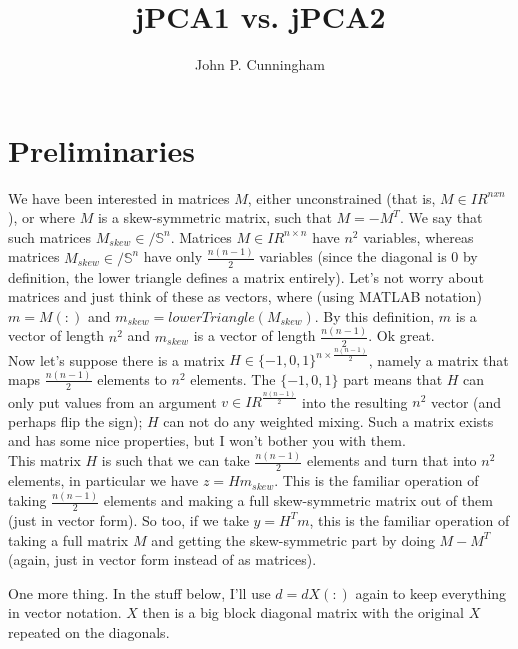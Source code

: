 \documentclass[11pt]{article}
\newcommand{\reals}{I\!\!R} %
\newcommand{\skewsym}{/\!\!\!\mathbb{S}}
\begin{document}
\title{jPCA1 vs. jPCA2}

\author{John P. Cunningham}


\maketitle


\section{Preliminaries}

We have been interested in matrices $M$, either unconstrained (that is, $M \in \reals^{n x n}$), or where $M$ is a skew-symmetric matrix, such that $M = -M^T$.  We say that such matrices $M_{skew} \in \skewsym^{n}$.  Matrices $M \in \reals^{n \times n}$ have $n^2$ variables, whereas matrices $M_{skew} \in \skewsym^{n}$ have only $\frac{n(n-1)}{2}$ variables (since the diagonal is 0 by definition, the lower triangle defines a matrix entirely).  Let's not worry about matrices and just think of these as vectors, where (using MATLAB notation) $m = M(:)$ and $m_{skew} = lowerTriangle(M_{skew})$.  By this definition, $m$ is a vector of length $n^2$ and $m_{skew}$ is a vector of length $\frac{n(n-1)}{2}$.  Ok great.
\\

Now let's suppose there is a matrix $H \in \{-1,0,1\}^{n \times \frac{n(n-1)}{2}}$, namely a matrix that maps $\frac{n(n-1)}{2}$ elements to $n^2$ elements.  The $\{-1,0,1\}$ part means that $H$ can only put values from an argument $v \in \reals^{\frac{n(n-1)}{2}}$ into the resulting $n^2$ vector (and perhaps flip the sign); $H$ can not do any weighted mixing.  Such a matrix exists and has some nice properties, but I won't bother you with them.
\\

This matrix $H$ is such that we can take $\frac{n(n-1)}{2}$ elements and turn that into $n^2$ elements, in particular we have $z = Hm_{skew}$.  This is the familiar operation of taking $\frac{n(n-1)}{2}$ elements and making a full skew-symmetric matrix out of them (just in vector form).  So too, if we take $y = H^Tm$, this is the familiar operation of taking a full matrix $M$ and getting the skew-symmetric part by doing $M-M^T$ (again, just in vector form instead of as matrices).  

One more thing.  In the stuff below, I'll use $d = dX(:)$ again to keep everything in vector notation.  $X$ then is a big block diagonal matrix with the original $X$ repeated on the diagonals. 
\end{document}
